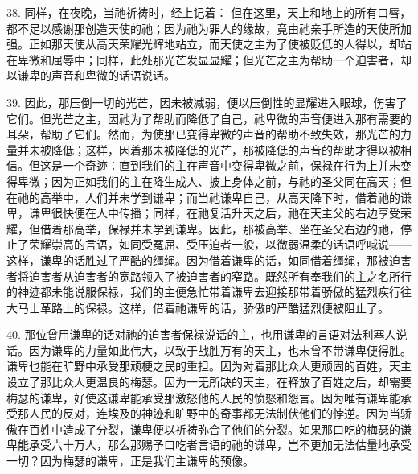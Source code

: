 38. 同样，在夜晚，当祂祈祷时，经上记着： 但在这里，天上和地上的所有口唇，都不足以感谢那创造天使的祂；因为祂为罪人的缘故，竟由祂亲手所造的天使所加强。正如那天使从高天荣耀光辉地站立，而天使之主为了使被贬低的人得以，却站在卑微和屈辱中；同样，此处那光芒发显显耀；但光芒之主为帮助一个迫害者，却以谦卑的声音和卑微的话语说话。\par

39. 因此，那压倒一切的光芒，因未被减弱，便以压倒性的显耀进入眼球，伤害了它们。但光芒之主，因祂为了帮助而降低了自己，祂卑微的声音便进入那有需要的耳朵，帮助了它们。然而，为使那已变得卑微的声音的帮助不致失效，那光芒的力量并未被降低；这样，因着那未被降低的光芒，那被降低的声音的帮助才得以被相信。但这是一个奇迹：直到我们的主在声音中变得卑微之前，保禄在行为上并未变得卑微；因为正如我们的主在降生成人、披上身体之前，与祂的圣父同在高天；但在祂的高举中，人们并未学到谦卑；而当祂谦卑自己，从高天降下时，借着祂的谦卑，谦卑很快便在人中传播；同样，在祂复活升天之后，祂在天主父的右边享受荣耀，但借着那高举，保禄并未学到谦卑。因此，那被高举、坐在圣父右边的祂，停止了荣耀崇高的言语，如同受冤屈、受压迫者一般，以微弱温柔的话语呼喊说—— 这样，谦卑的话胜过了严酷的缰绳。因为借着谦卑的话，如同借着缰绳，那被迫害者将迫害者从迫害者的宽路领入了被迫害者的窄路。既然所有奉我们的主之名所行的神迹都未能说服保禄，我们的主便急忙带着谦卑去迎接那带着骄傲的猛烈疾行往大马士革路上的保禄。这样，借着祂谦卑的话，骄傲的严酷猛烈便被阻止了。\par

40. 那位曾用谦卑的话对祂的迫害者保禄说话的主，也用谦卑的言语对法利塞人说话。因为谦卑的力量如此伟大，以致于战胜万有的天主，也未曾不带谦卑便得胜。谦卑也能在旷野中承受那顽梗之民的重担。因为对着那比众人更顽固的百姓，天主设立了那比众人更温良的梅瑟。因为一无所缺的天主，在释放了百姓之后，却需要梅瑟的谦卑，好使这谦卑能承受那激怒他的人民的愤怒和怨言。因为唯有谦卑能承受那人民的反对，连埃及的神迹和旷野中的奇事都无法制伏他们的悖逆。因为当骄傲在百姓中造成了分裂，谦卑便以祈祷弥合了他们的分裂。如果那口吃的梅瑟的谦卑能承受六十万人，那么那赐予口吃者言语的祂的谦卑，岂不更加无法估量地承受一切？因为梅瑟的谦卑，正是我们主谦卑的预像。\par

